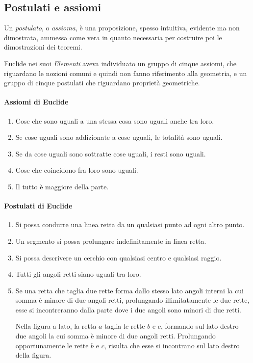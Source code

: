 \subsection{Postulati e assiomi}

Un \emph{postulato}, o \emph{assioma}, è una proposizione, spesso 
intuitiva, evidente ma non dimostrata, ammessa come vera in quanto 
necessaria per costruire poi le dimostrazioni dei teoremi.

Euclide nei suoi \emph{Elementi} aveva individuato un gruppo di 
cinque assiomi, che riguardano le nozioni comuni e quindi non fanno 
riferimento alla geometria, e un gruppo di cinque postulati che 
riguardano proprietà geometriche.

\paragraph{Assiomi di Euclide}
\begin{enumerate}[label=\Roman{*}.]
\item Cose che sono uguali a una stessa cosa sono uguali anche tra 
loro.
\item Se cose uguali sono addizionate a cose uguali, le totalità sono 
uguali.
\item Se da cose uguali sono sottratte cose uguali, i resti sono 
uguali.
\item Cose che coincidono fra loro sono uguali.
\item Il tutto è maggiore della parte.
\end{enumerate}

\paragraph{Postulati di Euclide}
\begin{enumerate}[label=\Roman{*}.]
\item Si possa condurre una linea retta da un qualsiasi punto ad ogni 
altro punto.
\item Un segmento si possa prolungare indefinitamente in linea retta.
\item Si possa descrivere un cerchio con qualsiasi centro e qualsiasi 
raggio.
\item Tutti gli angoli retti siano uguali tra loro.
\item Se una retta che taglia due rette forma dallo stesso lato 
angoli interni la cui somma è minore di due angoli retti, prolungando 
illimitatamente le due rette, esse si incontreranno dalla parte dove 
i due angoli sono minori di due retti.

\begin{minipage}{.49\textwidth}
\centering
\end{minipage}\hfil
\begin{minipage}{.45\textwidth}
Nella figura a lato, la retta $a$ taglia le rette $b$ e $c$, formando 
sul lato destro due angoli la cui somma è minore di due angoli retti. 
Prolungando opportunamente le rette $b$ e $c$, risulta che esse si 
incontrano sul lato destro della figura.
\end{minipage}
\end{enumerate}

